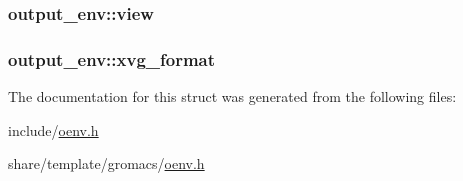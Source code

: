\hypertarget{structoutput__env_adff8c672632586cb93e2a618a258a573}{
\subsubsection[{view}]{ {\bf output\-\_\-env\-::view}}}\label{structoutput__env_adff8c672632586cb93e2a618a258a573}
\hypertarget{structoutput__env_a506afc2f61c4997373e67d54f849e90f}{
\subsubsection[{xvg\-\_\-format}]{ {\bf output\-\_\-env\-::xvg\-\_\-format}}}\label{structoutput__env_a506afc2f61c4997373e67d54f849e90f}


\-The documentation for this struct was generated from the following files\-:\begin{DoxyCompactItemize}
\item 
include/\hyperlink{include_2oenv_8h}{oenv.\-h}\item 
share/template/gromacs/\hyperlink{share_2template_2gromacs_2oenv_8h}{oenv.\-h}\end{DoxyCompactItemize}
